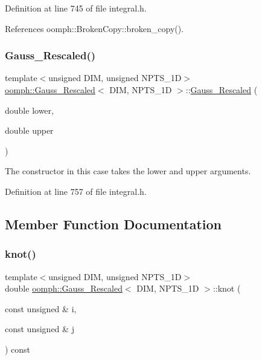 Definition at line 745 of file integral.\+h.



References oomph\+::\+Broken\+Copy\+::broken\+\_\+copy().

\mbox{\label{classoomph_1_1Gauss__Rescaled_a8ddf7f6af907a044fc0b03a24b6c1fd5}} 
\subsubsection{\texorpdfstring{Gauss\+\_\+\+Rescaled()}{Gauss\_Rescaled()}\hspace{0.1cm}{\footnotesize\ttfamily [3/3]}}
{\footnotesize\ttfamily template$<$unsigned D\+IM, unsigned N\+P\+T\+S\+\_\+1D$>$ \\
\hyperlink{classoomph_1_1Gauss__Rescaled}{oomph\+::\+Gauss\+\_\+\+Rescaled}$<$ D\+IM, N\+P\+T\+S\+\_\+1D $>$\+::\hyperlink{classoomph_1_1Gauss__Rescaled}{Gauss\+\_\+\+Rescaled} (\begin{DoxyParamCaption}\item[{double}]{lower,  }\item[{double}]{upper }\end{DoxyParamCaption})\hspace{0.3cm}{\ttfamily [inline]}}



The constructor in this case takes the lower and upper arguments. 



Definition at line 757 of file integral.\+h.



\subsection{Member Function Documentation}
\mbox{\label{classoomph_1_1Gauss__Rescaled_a66a4da25fa9d11f78cd7561fc049e488}} 
\subsubsection{\texorpdfstring{knot()}{knot()}}
{\footnotesize\ttfamily template$<$unsigned D\+IM, unsigned N\+P\+T\+S\+\_\+1D$>$ \\
double \hyperlink{classoomph_1_1Gauss__Rescaled}{oomph\+::\+Gauss\+\_\+\+Rescaled}$<$ D\+IM, N\+P\+T\+S\+\_\+1D $>$\+::knot (\begin{DoxyParamCaption}\item[{const unsigned \&}]{i,  }\item[{const unsigned \&}]{j }\end{DoxyParamCaption}) const\hspace{0.3cm}{\ttfamily [inline]}}



